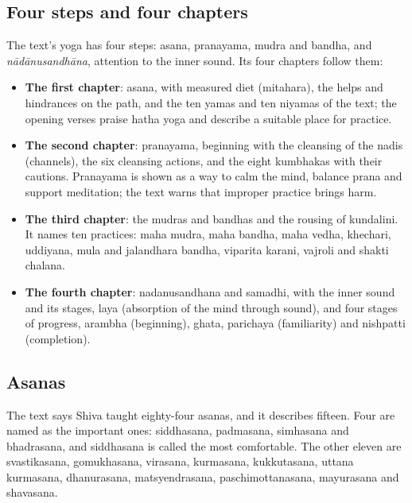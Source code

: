\subsection*{Four steps and four chapters}
The text's yoga has four steps: asana, pranayama, mudra and bandha, and \emph{nādānusandhāna}, attention to the inner sound. Its four chapters follow them:
\begin{itemize}
\item \textbf{The first chapter}: asana, with measured diet (mitahara), the helps and hindrances on the path, and the ten yamas and ten niyamas of the text; the opening verses praise hatha yoga and describe a suitable place for practice.
\item \textbf{The second chapter}: pranayama, beginning with the cleansing of the nadis (channels), the six cleansing actions, and the eight kumbhakas with their cautions. Pranayama is shown as a way to calm the mind, balance prana and support meditation; the text warns that improper practice brings harm.
\item \textbf{The third chapter}: the mudras and bandhas and the rousing of kundalini. It names ten practices: maha mudra, maha bandha, maha vedha, khechari, uddiyana, mula and jalandhara bandha, viparita karani, vajroli and shakti chalana.
\item \textbf{The fourth chapter}: nadanusandhana and samadhi, with the inner sound and its stages, laya (absorption of the mind through sound), and four stages of progress, arambha (beginning), ghata, parichaya (familiarity) and nishpatti (completion).
\end{itemize}

\subsection*{Asanas}
The text says Shiva taught eighty-four asanas, and it describes fifteen. Four are named as the important ones: siddhasana, padmasana, simhasana and bhadrasana, and siddhasana is called the most comfortable. The other eleven are svastikasana, gomukhasana, virasana, kurmasana, kukkutasana, uttana kurmasana, dhanurasana, matsyendrasana, paschimottanasana, mayurasana and shavasana.

